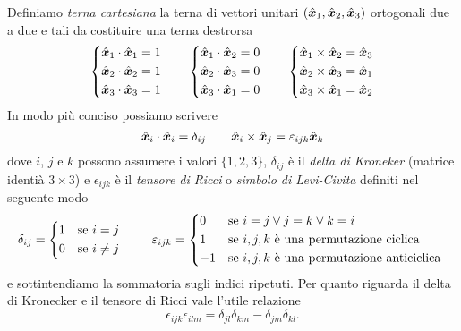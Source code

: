 Definiamo \emph{terna cartesiana} la terna di vettori unitari $ (\hat{\boldsymbol{x}}_1, \hat{\boldsymbol{x}}_2, \hat{\boldsymbol{x}}_3) $ ortogonali due a due e tali da costituire una terna destrorsa
\[\begin{cases*}
\vers x_1 \cdot \vers x_1 = 1 \\
\vers x_2 \cdot \vers x_2 = 1 \\
\vers x_3 \cdot \vers x_3 = 1 \\
\end{cases*}
\qquad 
\begin{cases*}
\vers x_1 \cdot \vers x_2 = 0 \\
\vers x_2 \cdot \vers x_3 = 0 \\
\vers x_3 \cdot \vers x_1 = 0
\end{cases*}
\qquad
\begin{cases*}
\vers x_1 \times \vers x_2 = \vers x_3 \\
\vers x_2 \times \vers x_3 = \vers x_1 \\
\vers x_3 \times \vers x_1 = \vers x_2 
\end{cases*}\]
In modo più conciso possiamo scrivere 
\begin{equation} \label{terna_cartesiana}
\hat{\boldsymbol{x}}_i \cdot \hat{\boldsymbol{x}}_i = \delta_{ij} \qquad \hat{\boldsymbol{x}}_i \times \hat{\boldsymbol{x}}_j = \varepsilon_{ijk} \hat{\boldsymbol{x}}_k
\end{equation}
dove $ i $, $ j $ e $ k $ possono assumere i valori $ \{1, 2, 3\} $, $ \delta_{ij} $ è il \emph{delta di Kroneker} (matrice identià $ 3 \times 3 $) e $ \epsilon_{ijk} $ è il \emph{tensore di Ricci} o \emph{simbolo di Levi-Civita} definiti nel seguente modo
\[\delta_{ij} = 
\begin{cases*}
1 & \text{se $ i = j $} \\
0 & \text{se $ i \neq j $} \\
\end{cases*}
\qquad 
\epsilon_{ijk} = 
\begin{cases*}
0 & \text{se $ i = j \vee j = k \vee k = i $} \\
1 & \text{se $ i, j, k $ è una permutazione ciclica} \\
-1 & \text{se $ i, j, k $ è una permutazione anticiclica} \\
\end{cases*}\]
e sottintendiamo la sommatoria sugli indici ripetuti. Per quanto riguarda il delta di Kronecker e il tensore di Ricci vale l'utile relazione
\begin{equation} \label{epsilon_delta}
\epsilon_{ijk}\epsilon_{ilm} = \delta_{jl}\delta_{km} - \delta_{jm}\delta_{kl}.
\end{equation}
